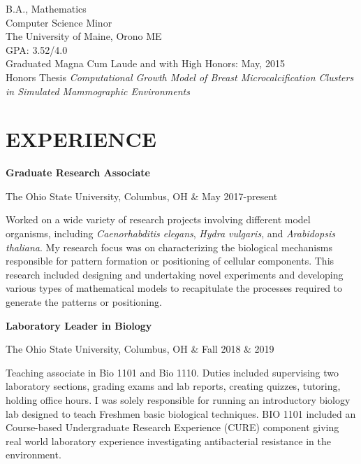 \documentclass[10pt]{res} %
\begin{document}
\begin{resume}
        B.A., Mathematics \\
        Computer Science Minor\\
        The University of Maine, Orono ME \\ 
        GPA: 3.52/4.0 \\
         Graduated Magna Cum Laude and with High Honors: May, 2015\\
        Honors Thesis {\it Computational Growth Model of Breast Microcalcification Clusters in Simulated Mammographic Environments}\\
 
 
\section{EXPERIENCE}      
		{\bf Graduate Research Associate} \\
        \begin{ncolumn}{2} %
        The Ohio State University, Columbus, OH     &      May 2017-present 
        \end{ncolumn}
                
        Worked on a wide variety of research projects involving different model organisms, including \textit{Caenorhabditis elegans}, \textit{Hydra vulgaris}, and \textit{Arabidopsis thaliana}. My research focus was on characterizing the biological mechanisms responsible for pattern formation or positioning of cellular components. This research included designing and undertaking novel experiments and developing various types of mathematical models to recapitulate the processes required to generate the patterns or positioning.
                
        {\bf Laboratory Leader in Biology} \\
        \begin{ncolumn}{2} %
        The Ohio State University, Columbus, OH     &      Fall 2018 \& 2019 
        \end{ncolumn}

        Teaching associate in Bio 1101 and Bio 1110. Duties included supervising two laboratory sections, grading exams and lab reports, creating quizzes, tutoring, holding office hours. I was solely responsible for running an introductory biology lab designed to teach Freshmen basic biological techniques. BIO 1101 included an Course-based Undergraduate Research Experience (CURE) component giving real world laboratory experience investigating antibacterial resistance in the environment.
                

\end{resume}
\end{document}
